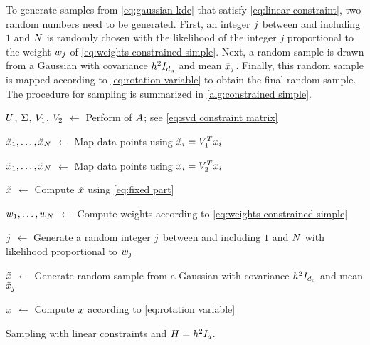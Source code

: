 To generate samples from \cref{eq:gaussian kde} that satisfy \cref{eq:linear constraint}, two random numbers need to be generated. 
First, an integer $j$ between and including $1$ and $N$ is randomly chosen with the likelihood of the integer $j$ proportional to the weight $w_{j}$ of \cref{eq:weights constrained simple}. 
Next, a random sample is drawn from a Gaussian with covariance $h^2 I_{d_\mathrm{u}}$ and mean $\hat{x}_{j}$.
Finally, this random sample is mapped according to \cref{eq:rotation variable} to obtain the final random sample.
The procedure for sampling is summarized in \cref{alg:constrained simple}.

\begin{algorithm}[t]
	
	$U$, $\Sigma$, $V_1$, $V_2$ $\gets$ Perform  of $A$; see \cref{eq:svd constraint matrix}
	
	$\breve{x}_{1},\ldots,\breve{x}_{N}$ $\gets$ Map data points using $\breve{x}_{i} = V_1^T x_{i}$
		
	$\tilde{x}_{1},\ldots,\tilde{x}_{N}$ $\gets$ Map data points using $\tilde{x}_{i} = V_2^T x_{i}$
	
	$\breve{x}$ $\gets$ Compute $\breve{x}$ using \cref{eq:fixed part}
	
	$w_{1},\ldots,w_{N}$ $\gets$ Compute weights according to \cref{eq:weights constrained simple}
	
	$j$ $\gets$ Generate a random integer $j$ between and including $1$ and $N$ with likelihood proportional to $w_{j}$
	
	$\tilde{x}$ $\gets$ Generate random sample from a Gaussian with covariance $h^2 I_{d_\mathrm{u}}$ and mean $\tilde{x}_{j}$
	
	$x$ $\gets$ Compute $x$ according to \cref{eq:rotation variable}
		
	\caption{Sampling with linear constraints and $H=h^2 I_{d}$.}
	\label{alg:constrained simple}
\end{algorithm}



